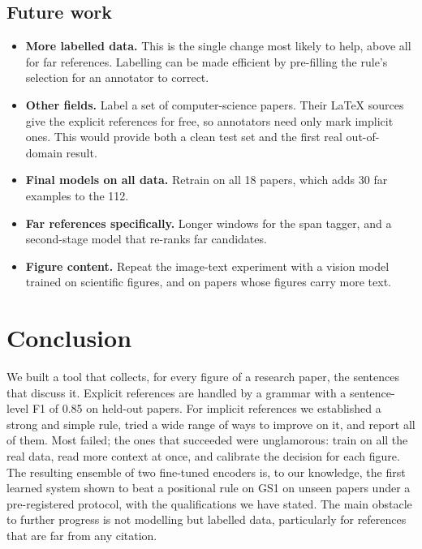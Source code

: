 \subsection{Future work}
\begin{itemize}
  \item \textbf{More labelled data.} This is the single change most likely to help, above all for far
        references. Labelling can be made efficient by pre-filling the rule's selection for an annotator to
        correct.
  \item \textbf{Other fields.} Label a set of computer-science papers. Their \LaTeX{} sources give the explicit
        references for free, so annotators need only mark implicit ones. This would provide both a clean test
        set and the first real out-of-domain result.
  \item \textbf{Final models on all data.} Retrain on all 18 papers, which adds 30 far examples to the 112.
  \item \textbf{Far references specifically.} Longer windows for the span tagger, and a second-stage model
        that re-ranks far candidates.
  \item \textbf{Figure content.} Repeat the image-text experiment with a vision model trained on scientific
        figures, and on papers whose figures carry more text.
\end{itemize}

\section{Conclusion}
We built a tool that collects, for every figure of a research paper, the sentences that discuss it. Explicit
references are handled by a grammar with a sentence-level F1 of 0.85 on held-out papers. For implicit
references we established a strong and simple rule, tried a wide range of ways to improve on it, and report
all of them. Most failed; the ones that succeeded were unglamorous: train on all the real data, read more
context at once, and calibrate the decision for each figure. The resulting ensemble of two fine-tuned encoders
is, to our knowledge, the first learned system shown to beat a positional rule on \figsum{} GS1 on unseen
papers under a pre-registered protocol, with the qualifications we have stated. The main obstacle to further
progress is not modelling but labelled data, particularly for references that are far from any citation.
